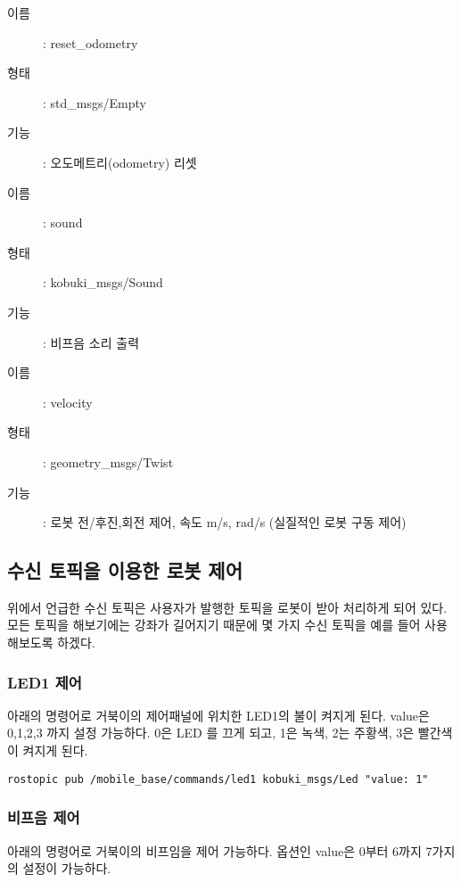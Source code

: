\vspace{\baselineskip}
\begin{description}
\item[이름]: reset\_odometry
\item[형태]: std\_msgs/Empty
\item[기능]: 오도메트리(odometry) 리셋
\end{description}

\vspace{\baselineskip}
\begin{description}
\item[이름]: sound
\item[형태]: kobuki\_msgs/Sound
\item[기능]: 비프음 소리 출력
\end{description}

\vspace{\baselineskip}
\begin{description}
\item[이름]: velocity
\item[형태]: geometry\_msgs/Twist
\item[기능]: 로봇 전/후진,회전 제어, 속도 m/s, rad/s (실질적인 로봇 구동 제어)
\end{description}

\subsection{수신 토픽을 이용한 로봇 제어}

위에서 언급한 수신 토픽은 사용자가 발행한 토픽을 로봇이 받아 처리하게 되어 있다. 모든 토픽을 해보기에는 강좌가 길어지기 때문에 몇 가지 수신 토픽을 예를 들어 사용해보도록 하겠다.

\subsubsection{LED1 제어}
아래의 명령어로 거북이의 제어패널에 위치한 LED1의 불이 켜지게 된다. value은 0,1,2,3 까지 설정 가능하다. 0은 LED 를 끄게 되고, 1은 녹색, 2는 주황색, 3은 빨간색이 켜지게 된다.

\begin{lstlisting}[language=ROS]
rostopic pub /mobile_base/commands/led1 kobuki_msgs/Led "value: 1"
\end{lstlisting}


\subsubsection{비프음 제어}
아래의 명령어로 거북이의 비프임을 제어 가능하다. 옵션인 value은 0부터 6까지 7가지의 설정이 가능하다. 

